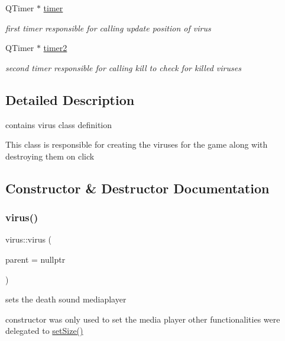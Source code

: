 \begin{DoxyCompactItemize}
Q\+Timer $\ast$ \hyperlink{classvirus_ab7a1a248f91d2826090771212b62681f}{timer}
\begin{DoxyCompactList}\small\item\em first timer responsible for calling update position of virus \end{DoxyCompactList}\item 
\mbox{\label{classvirus_a7fee7454da0a4960783f23fbfa42e1c7}} 
Q\+Timer $\ast$ \hyperlink{classvirus_a7fee7454da0a4960783f23fbfa42e1c7}{timer2}
\begin{DoxyCompactList}\small\item\em second timer responsible for calling kill to check for killed viruses \end{DoxyCompactList}\end{DoxyCompactItemize}


\subsection{Detailed Description}
contains virus class definition 

This class is responsible for creating the viruses for the game along with destroying them on click 

\subsection{Constructor \& Destructor Documentation}
\mbox{\label{classvirus_aec80936bff04cb885c64075219835d45}} 
\subsubsection{\texorpdfstring{virus()}{virus()}}
{\footnotesize\ttfamily virus\+::virus (\begin{DoxyParamCaption}\item[{Q\+Object $\ast$}]{parent = {\ttfamily nullptr} }\end{DoxyParamCaption})\hspace{0.3cm}{\ttfamily [explicit]}}



sets the death sound mediaplayer 

constructor was only used to set the media player other functionalities were delegated to \hyperlink{classvirus_a7e52ed4f11deb1997a7fdbc07c7b038a}{set\+Size()} 

